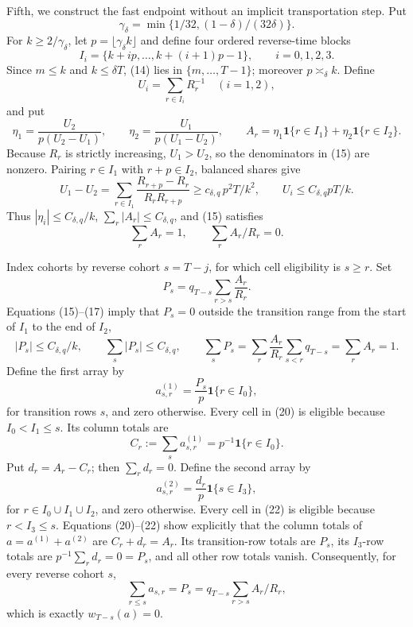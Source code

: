 Fifth, we construct the fast endpoint without an implicit transportation step.  Put
\[
 \gamma_\delta=\min\{1/32,(1-\delta)/(32\delta)\}.
\]
For \(k\ge2/\gamma_\delta\), let \(p=\lfloor\gamma_\delta k\rfloor\) and define four ordered reverse-time blocks
\[
 I_i=\{k+ip,\ldots,k+(i+1)p-1\},\qquad i=0,1,2,3.                \tag{14}
\]
Since \(m\le k\) and \(k\le\delta T\), (14) lies in \(\{m,\ldots,T-1\}\); moreover \(p\asymp_\delta k\).  Define
\[
 U_i=\sum_{r\in I_i}R_r^{-1}\quad(i=1,2),
\]
and put
\[
 \eta_1=\frac{U_2}{p(U_2-U_1)},
 \qquad
 \eta_2=\frac{U_1}{p(U_1-U_2)},
 \qquad
 A_r=\eta_1\mathbf1\{r\in I_1\}+\eta_2\mathbf1\{r\in I_2\}. \tag{15}
\]
Because \(R_r\) is strictly increasing, \(U_1>U_2\), so the denominators in (15) are nonzero.  Pairing \(r\in I_1\) with \(r+p\in I_2\), balanced shares give
\[
 U_1-U_2
 =\sum_{r\in I_1}\frac{R_{r+p}-R_r}{R_rR_{r+p}}
 \ge c_{\delta,q}\,p^2T/k^2,
 \qquad U_i\le C_{\delta,q}pT/k.                                \tag{16}
\]
Thus \(|\eta_i|\le C_{\delta,q}/k\), \(\sum_r|A_r|\le C_{\delta,q}\), and (15) satisfies
\[
 \sum_rA_r=1,
 \qquad \sum_rA_r/R_r=0.                                       \tag{17}
\]

Index cohorts by reverse cohort \(s=T-j\), for which cell eligibility is \(s\ge r\).  Set
\[
 P_s=q_{T-s}\sum_{r>s}\frac{A_r}{R_r}.                          \tag{18}
\]
Equations (15)--(17) imply that \(P_s=0\) outside the transition range from the start of \(I_1\) to the end of \(I_2\),
\[
 |P_s|\le C_{\delta,q}/k,
 \qquad \sum_s|P_s|\le C_{\delta,q},
 \qquad \sum_sP_s=\sum_r\frac{A_r}{R_r}\sum_{s<r}q_{T-s}
 =\sum_rA_r=1.                                                   \tag{19}
\]
Define the first array by
\[
 a^{(1)}_{s,r}=\frac{P_s}{p}\mathbf1\{r\in I_0\},              \tag{20}
\]
for transition rows \(s\), and zero otherwise.  Every cell in (20) is eligible because \(I_0<I_1\le s\).  Its column totals are
\[
 C_r:=\sum_sa^{(1)}_{s,r}=p^{-1}\mathbf1\{r\in I_0\}.          \tag{21}
\]
Put \(d_r=A_r-C_r\); then \(\sum_rd_r=0\).  Define the second array by
\[
 a^{(2)}_{s,r}=\frac{d_r}{p}\mathbf1\{s\in I_3\},              \tag{22}
\]
for \(r\in I_0\cup I_1\cup I_2\), and zero otherwise.  Every cell in (22) is eligible because \(r<I_3\le s\).  Equations (20)--(22) show explicitly that the column totals of \(a=a^{(1)}+a^{(2)}\) are \(C_r+d_r=A_r\).  Its transition-row totals are \(P_s\), its \(I_3\)-row totals are \(p^{-1}\sum_rd_r=0=P_s\), and all other row totals vanish.  Consequently, for every reverse cohort \(s\),
\[
 \sum_{r\le s}a_{s,r}=P_s
 =q_{T-s}\sum_{r>s}A_r/R_r,                                    \tag{23}
\]
which is exactly \(w_{T-s}(a)=0\).

